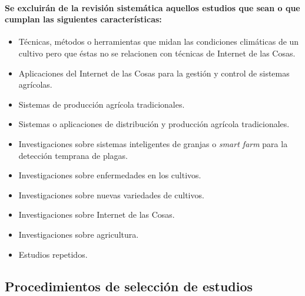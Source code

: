 \documentclass[10pt, twocolumn]{article}
\begin{document}
\paragraph{Se excluirán de la revisión sistemática aquellos estudios que sean o que cumplan las siguientes características:}
\begin{itemize}
	\item{Técnicas, métodos o herramientas que midan las condiciones climáticas de un cultivo pero que éstas no se relacionen con técnicas de Internet de las Cosas.}
	\item{Aplicaciones del Internet de las Cosas para la gestión y control de sistemas agrícolas.}
	\item{Sistemas de producción agrícola tradicionales.}
	\item{Sistemas o aplicaciones de distribución y producción agrícola tradicionales.}
	\item{Investigaciones sobre sistemas inteligentes de granjas o \textit{smart farm} para la detección temprana de plagas.}
	\item{Investigaciones sobre enfermedades en los cultivos.}
	\item{Investigaciones sobre nuevas variedades de cultivos.}
	\item{Investigaciones sobre Internet de las Cosas.}
	\item{Investigaciones sobre agricultura.}
	\item{Estudios repetidos.}
\end{itemize}

\subsection{Procedimientos de selección de estudios}
\end{document}

